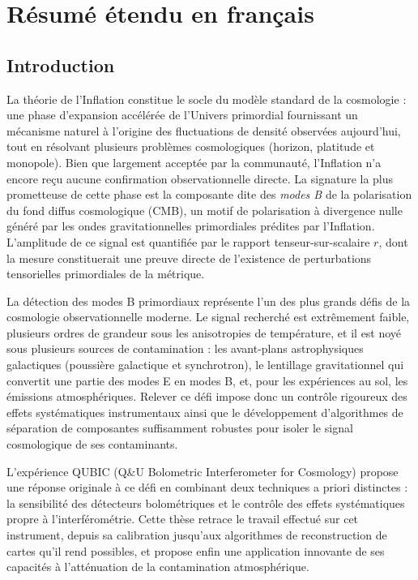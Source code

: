 \chapter*{Résumé étendu en français}
\fancyhead{}

\section*{Introduction}

La théorie de l'Inflation constitue le socle du modèle standard de la cosmologie : une phase d'expansion accélérée de l'Univers primordial fournissant un mécanisme naturel à l'origine des fluctuations de densité observées aujourd'hui, tout en résolvant plusieurs problèmes cosmologiques (horizon, platitude et monopole). Bien que largement acceptée par la communauté, l'Inflation n'a encore reçu aucune confirmation observationnelle directe. La signature la plus prometteuse de cette phase est la composante dite des \emph{modes B} de la polarisation du fond diffus cosmologique (CMB), un motif de polarisation à divergence nulle généré par les ondes gravitationnelles primordiales prédites par l'Inflation. L'amplitude de ce signal est quantifiée par le rapport tenseur-sur-scalaire $r$, dont la mesure constituerait une preuve directe de l'existence de perturbations tensorielles primordiales de la métrique.

La détection des modes B primordiaux représente l'un des plus grands défis de la cosmologie observationnelle moderne. Le signal recherché est extrêmement faible, plusieurs ordres de grandeur sous les anisotropies de température, et il est noyé sous plusieurs sources de contamination : les avant-plans astrophysiques galactiques (poussière galactique et synchrotron), le lentillage gravitationnel qui convertit une partie des modes E en modes B, et, pour les expériences au sol, les émissions atmosphériques. Relever ce défi impose donc un contrôle rigoureux des effets systématiques instrumentaux ainsi que le développement d'algorithmes de séparation de composantes suffisamment robustes pour isoler le signal cosmologique de ses contaminants.

L'expérience QUBIC (Q\&U Bolometric Interferometer for Cosmology) propose une réponse originale à ce défi en combinant deux techniques a priori distinctes : la sensibilité des détecteurs bolométriques et le contrôle des effets systématiques propre à l'interférométrie. Cette thèse retrace le travail effectué sur cet instrument, depuis sa calibration jusqu'aux algorithmes de reconstruction de cartes qu'il rend possibles, et propose enfin une application innovante de ses capacités à l'atténuation de la contamination atmosphérique.

